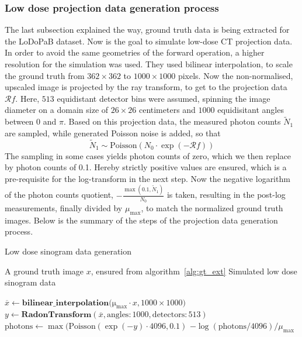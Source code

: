 \documentclass[12pt,a4paper]{article}
\begin{document}
\subsubsection{Low dose projection data generation process}
The last subsection explained the way, ground truth data is being extracted for the LoDoPaB dataset. Now is the goal to simulate low-dose CT projection data. In order to avoid the same geometries of the forward operation, a higher resolution for the simulation was used. They used bilinear interpolation, to scale the ground truth from $362 \times 362$ to $1000 \times 1000$ pixels. Now the non-normalised, upscaled image is projected by the ray transform, to get to the projection data $\mathcal R f$. Here, $513$ equidistant detector bins were assumed, spinning the image diameter on a domain size of $26 \times 26$ centimeters and $1000$ equidisitant angles between $0$ and $\pi$. Based on this projection data, the measured photon counts $\tilde N_1$ are sampled, while generated Poisson noise is added, so that 
\begin{equation}
    \tilde N_1 \sim \mathrm{Poisson}(N_0 \cdot \exp(-\mathcal R f))
\end{equation}The sampling in some cases yields photon counts of zero, which we then replace by photon counts of 0.1. Hereby strictly positive values are ensured, which is a pre-requisite for the log-transform in the next step. Now the negative logarithm of the photon counts quotient,  $-\frac{\max(0.1, \tilde N_1)}{N_0}$ is taken, resulting in the post-log measurements, finally divided by $\mu_\mathrm{max}$, to match the normalized ground truth images. Below is the summary of the steps of the projection data generation process. 
\begin{algorithm}
\caption{Low dose sinogram data generation}\label{alg:ld_gen}
\begin{algorithmic}[1] %
\Require A ground truth image $x$, ensured from algorithm~\ref{alg:gt_ext}
\Ensure Simulated low dose sinogram data 

\State $\overline{x} \gets \mathrm{\textbf{bilinear\_interpolation}(\mu_{max}} \cdot x, 1000 \times 1000)$
\State $y \gets \mathrm{\textbf{RadonTransform}}(\overline{x}, \mathrm{angles: 1000}, \mathrm{detectors: 513} )$
\State $\mathrm{photons} \gets \max(\mathrm{Poisson}(\exp(-y) \cdot 4096, 0.1)$
\State \Return $-\log(\mathrm{photons}/4096)/\mu_{\mathrm{max}}$
\end{algorithmic}
\end{algorithm}
\end{document}
